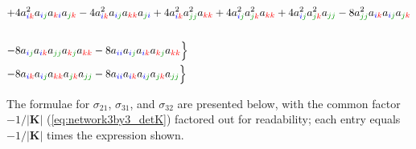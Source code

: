 \documentclass{article}
\begin{document}
\begin{equation}
\begin{aligned}
+ & 4  a_{\idx{i}{k}}^{2} a_{\idx{i}{j}} a_{\idx{k}{i}} a_{\idx{j}{k}}  - 4 a_{\idx{i}{k}}^{2} a_{\idx{i}{j}} a_{\idx{k}{k}} a_{\idx{j}{i}}  + 4 a_{\idx{i}{k}}^{2} a_{\idx{j}{j}}^{2} a_{\idx{k}{k}} + 4 a_{\idx{i}{j}}^{2} a_{\idx{j}{k}}^{2} a_{\idx{k}{k}} + 4 a_{\idx{i}{j}}^{2} a_{\idx{j}{k}}^{2} a_{\idx{j}{j}} - 8  a_{\idx{j}{j}}^{2} a_{\idx{i}{k}} a_{\idx{i}{j}}  a_{\idx{j}{k}}    \\
\\
 - & 8 a_{\idx{i}{j}} a_{\idx{i}{k}} a_{\idx{j}{j}} a_{\idx{k}{j}} a_{\idx{k}{k}} - 8 a_{\idx{i}{i}} a_{\idx{i}{j}} a_{\idx{i}{k}} a_{\idx{k}{j}} a_{\idx{k}{k}} \Bigr\} \\
 - & 8 a_{\idx{i}{k}} a_{\idx{i}{j}} a_{\idx{k}{k}} a_{\idx{j}{k}} a_{\idx{j}{j}}   - 8 a_{\idx{i}{i}} a_{\idx{i}{k}} a_{\idx{i}{j}} a_{\idx{j}{k}} a_{\idx{j}{j}}  \Bigr\}
\end{aligned}
\label{eq:network3by3_sigma_ii}
\end{equation}

The formulae for $\sigma_{21}$, $\sigma_{31}$, and $\sigma_{32}$ are presented below, with the common factor $-1/|\mathbf{K}|$ (\ref{eq:network3by3_detK}) factored out for readability; each entry equals $-1/|\mathbf{K}|$ times the expression shown.
\end{document}
